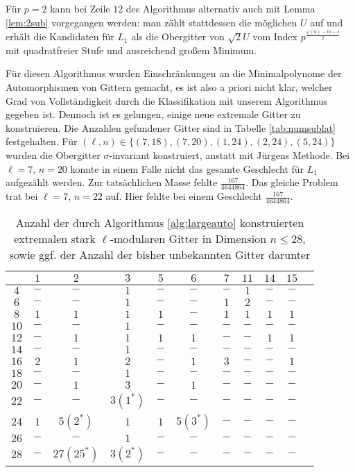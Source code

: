 \documentclass[12pt,a4paper,halfparskip,headsepline,bibtotocnumbered]{scrreprt}
\theoremstyle{nummermitklammern}
\theoremstyle{nonumberbreak}
\begin{document}
Für $p = 2$ kann bei Zeile $12$ des Algorithmus alternativ auch mit Lemma \eqref{lem:2sub} vorgegangen werden: man zählt stattdessen die möglichen $U$ auf und erhält die Kandidaten für $L_1$ als die Obergitter von $\sqrt{2} U$ vom Index $p^\frac{\varphi(n)-m - s}{2}$ mit quadratfreier Stufe und ausreichend großem Minimum.\par
Für diesen Algorithmus wurden Einschränkungen an die Minimalpolynome der Automorphismen von Gittern gemacht, es ist also a priori nicht klar, welcher Grad von Vollständigkeit durch die Klassifikation mit unserem Algorithmus gegeben ist. Dennoch ist es gelungen, einige neue extremale Gitter zu konstruieren. Die Anzahlen gefundener Gitter sind in Tabelle \eqref{tab:numsublat} festgehalten. Für $(\ell, n) \in \lbrace (7,18), (7,20), (1,24), (2,24), (5,24) \rbrace$ wurden die Obergitter $\sigma$-invariant konstruiert, anstatt mit Jürgens Methode. Bei $\ell = 7$, $n = 20$ konnte in einem Falle nicht das gesamte Geschlecht für $L_1$ aufgezählt werden. Zur tatsächlichen Masse fehlte $\frac{167}{4644864}$. Das gleiche Problem trat bei $\ell = 7$, $n = 22$ auf. Hier fehlte bei einem Geschlecht $\frac{167}{4644864}$.

\begin{table}[H]\label{tab:numsublat}
	\centering
	\begin{tabular}{|c||c|c|c|c|c|c|c|c|c|c|}
		\hline
		\backslashbox{$n$}{$\ell$}	&$1$	&$2$	&$3$	&$5$	&$6$	&$7$	&$11$	&$14$	&$15$\\ \hline \hline
		$4$		&$-$		&$-$		&$1$		&$-$		&$-$		&$-$		&$1$		&$-$		&$-$\\ \hline
		$6$		&$-$		&$-$		&$1$		&$-$		&$-$		&$1$		&$2$		&$-$		&$-$\\ \hline
		$8$		&$1$		&$1$		&$1$		&$1$		&$-$		&$1$		&$1$		&$1$		&$1$\\ \hline
		$10$	&$-$		&$-$		&$1$		&$-$		&$-$		&$-$		&$-$		&$-$		&$-$\\ \hline
		$12$	&$-$		&$1$		&$1$		&$1$		&$1$		&$-$		&$-$		&$1$		&$1$\\ \hline
		$14$	&$-$		&$-$		&$1$		&$-$		&$-$		&$-$		&$-$		&$-$		&$-$\\ \hline
		$16$	&$2$		&$1$		&$2$		&$-$		&$1$		&$3$		&$-$		&$-$		&$1$\\ \hline
		$18$	&$-$		&$-$		&$1$		&$-$		&$-$		&$-$		&$-$		&$-$		&$-$\\ \hline
		$20$	&$-$		&$1$		&$3$		&$-$		&$1$		&$-$		&$-$		&$-$		&$-$\\ \hline
		$22$	&$-$		&$-$		&$3(1^\ast)$&$-$		&$-$		&$-$		&$-$		&$-$		&$-$\\ \hline
		$24$	&$1$		&$5(2^\ast)$&$1$		&$1$		&$5(3^\ast)$&$-$		&$-$		&$-$		&$-$\\ \hline
		$26$	&$-$		&$-$		&$1$		&$-$		&$-$		&$-$		&$-$		&$-$		&$-$\\ \hline
		$28$	&$-$		&$27(25^\ast)$&$3(2^\ast)$&$-$		&$-$		&$-$		&$-$		&$-$		&$-$\\ \hline
	\end{tabular}
	\caption{Anzahl der durch Algorithmus \eqref{alg:largeauto} konstruierten extremalen stark $\ell$-modularen Gitter in Dimension $n \leq 28$, sowie ggf. der Anzahl der bisher unbekannten Gitter darunter}
\end{table}
\end{document}
